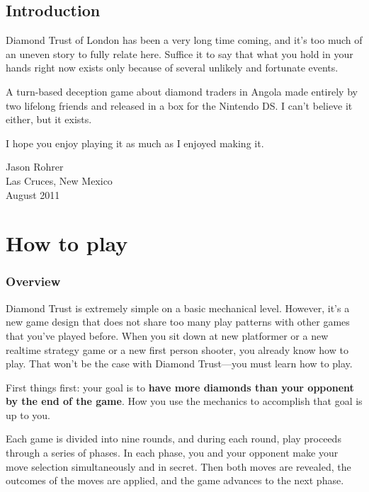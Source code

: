 \documentclass[8pt]{extbook}
\begin{document}
\frontmatter

\tableofcontents


\chapter{Introduction}

Diamond Trust of London has been a very long time coming, and it's too much of an uneven story to fully relate here.  Suffice it to say that what you hold in your hands right now exists only because of several unlikely and fortunate events.  

A turn-based deception game about diamond traders in Angola made entirely by two lifelong friends and released in a box for the Nintendo DS.  I can't believe it either, but it exists.  

I hope you enjoy playing it as much as I enjoyed making it.

\begin{flushright}
\begin{minipage}{1.5in}
Jason Rohrer\\
Las Cruces, New Mexico\\
August 2011
\end{minipage}
\end{flushright}

\mainmatter

\part{How to play}
\addtocounter{chapter}{1}
\setcounter{section}{0}

\section{Overview}
Diamond Trust is extremely simple on a basic mechanical level.  However, it's a new game design that does not share too many play patterns with other games that you've played before.  When you sit down at new platformer or a new realtime strategy game or a new first person shooter, you already know how to play.  That won't be the case with Diamond Trust---you must learn how to play.

First things first:  your goal is to {\bf have more diamonds than your opponent by the end of the game}.  How you use the mechanics to accomplish that goal is up to you.

Each game is divided into nine rounds, and during each round, play proceeds through a series of phases.  In each phase, you and your opponent make your move selection simultaneously and in secret.  Then both moves are revealed, the outcomes of the moves are applied, and the game advances to the next phase.
\end{document}
